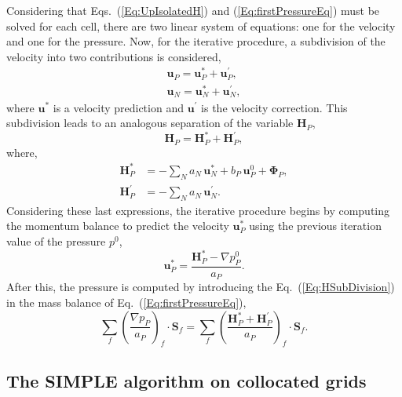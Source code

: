 \documentclass[final,3p,times,11pt,onecolumn]{myElsarticle}
\numberwithin{equation}{section}
\begin{document}
Considering that Eqs.~(\ref{Eq:UpIsolatedH}) and (\ref{Eq:firstPressureEq}) must be solved for each cell, there are two linear system of equations: one for the velocity and one for the pressure. Now, for the iterative procedure, a subdivision of the velocity into two contributions is considered,
\begin{align}
\label{Eq:velocitySubdiv}
\boldsymbol{u}_P
= 
\boldsymbol{u}_P^{*} 
+
\boldsymbol{u}_P^{'}, \\
\boldsymbol{u}_N
= 
\boldsymbol{u}_N^{*} 
+
\boldsymbol{u}_N^{'},
\end{align}
where $\boldsymbol{u}^{*}$ is a velocity prediction and $\boldsymbol{u}^{'}$ is the velocity correction. This subdivision leads to an analogous separation of the variable $\boldsymbol{H}_P$,
\begin{equation}
\label{Eq:HSubDivision}
\boldsymbol{H}_P 
=
\boldsymbol{H}_P^{*}
+
\boldsymbol{H}_P^{'},
\end{equation}
where,
\begin{align}
\label{Eq:HStar}
\boldsymbol{H}_P^{*} 
&= -\sum_{N} a_{N}\,\boldsymbol{u}_{N}^{*}
+
b_P\, \boldsymbol{u}^0_P 
+ 
\boldsymbol{\Phi}_P,
\\
\label{Eq:HPrima}
\boldsymbol{H}_P^{'}
&= -\sum_{N} a_{N}\,\boldsymbol{u}_{N}^{'}. 
\end{align}
Considering these last expressions, the iterative procedure begins by computing the momentum balance to predict the velocity $\boldsymbol{u}_P^{*}$ using the previous iteration value of the pressure $p^{0}$,
\begin{equation}
\label{Eq:MomentumPredictor}
\boldsymbol{u}_P^{*}
=
\dfrac
{
\boldsymbol{H}_P^*
- 
\nabla p_P^{0}}
{a_P}.
\end{equation}
After this, the pressure is computed by introducing the Eq.~(\ref{Eq:HSubDivision}) in the mass balance of Eq.~(\ref{Eq:firstPressureEq}),
\begin{equation}
\label{Eq:pressureEqSubdiv}
\sum_{f} 
\left(
\dfrac
{
\nabla p_P}
{a_P}
\right)_f
\cdotp 
\textbf{S}_{f}
=
\sum_{f} 
\left(
\dfrac
{
\boldsymbol{H}_P^{*}
+
\boldsymbol{H}_P^{'}
}
{a_P}
\right)_f
\cdotp 
\textbf{S}_{f}.
\end{equation}

\subsection{The SIMPLE algorithm on collocated grids}
\end{document}
